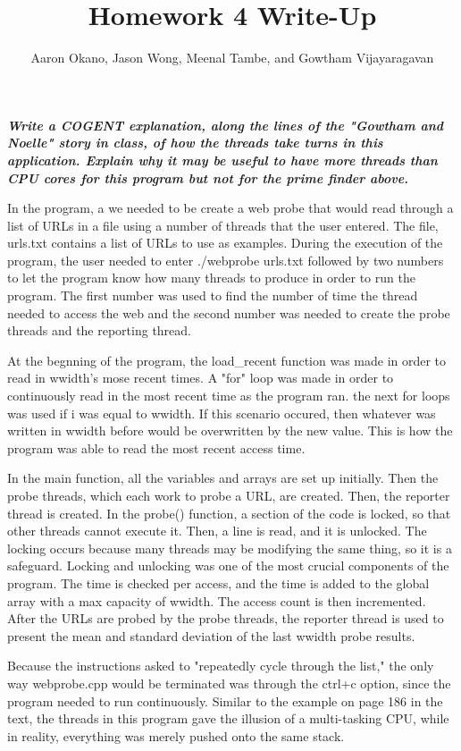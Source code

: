 \documentclass[12pt,letterpaper]{article}
\title{Homework 4 Write-Up}
\author{Aaron Okano, Jason Wong, Meenal Tambe, and Gowtham Vijayaragavan}
\begin{document}
\maketitle
\setcounter{page}{1}
\textit{\textbf{Write a COGENT explanation, along the lines of the "Gowtham and Noelle" story in class, of how the threads take turns in this application. Explain why it may be useful to have more threads than CPU cores for this program but not for the prime finder above.}}
\newline

\linespread{1.5}
In the program, a we needed to be create a web probe that would read through a list of URLs in a file using a number of threads that the user entered. The file, urls.txt contains a list of URLs to use as examples. During the execution of the program, the user needed to enter ./webprobe urls.txt followed by two numbers to let the program know how many threads to produce in order to run the program. The first number was used to find the number of time the thread needed to access the web and the second number was needed to create the probe threads and the reporting thread. 

At the begnning of the program, the load\_recent function was made in order to read in wwidth's mose recent times. A "for" loop was made in order to continuously read in the most recent time as the program ran. the next for loops was used if i was equal to wwidth. If this scenario occured, then whatever was written in wwidth before would be overwritten by the new value. This is how the program was able to read the most recent access time. 

In the main function, all the variables and arrays are set up initially. Then the probe threads, which each work to probe a URL, are created. Then, the reporter thread is created. In the probe() function, a section of the code is locked, so that other threads cannot execute it. Then, a line is read, and it is unlocked. The locking occurs because many threads may be modifying the same thing, so it is a safeguard. Locking and unlocking was one of the most crucial components of the program. The time is checked per access, and the time is added to the global array with a max capacity of wwidth. The access count is then incremented. After the URLs are probed by the probe threads, the reporter thread is used to present the mean and standard deviation of the last wwidth probe results.

Because the instructions asked to "repeatedly cycle through the list," the only way webprobe.cpp would be terminated was through the ctrl+c option, since the program needed to run continuously. Similar to the example on page 186 in the text, the threads in this program gave the illusion of a multi-tasking CPU, while in reality, everything was merely pushed onto the same stack. 
\end{document}
